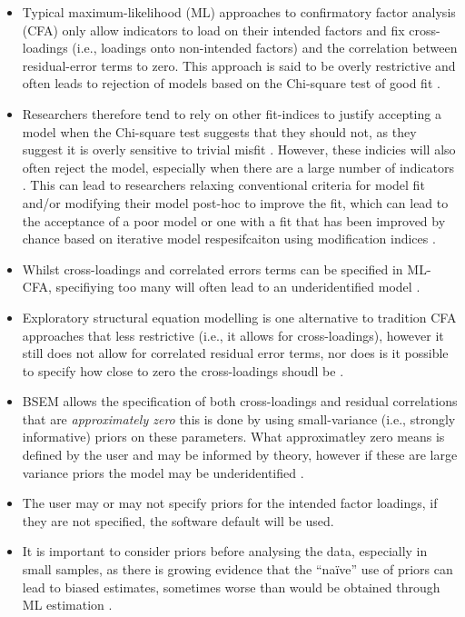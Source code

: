 \documentclass[
]{book}
\providecommand{\tightlist}{%
  \setlength{\itemsep}{0pt}\setlength{\parskip}{0pt}}
\begin{document}
\begin{itemize}
\tightlist
\item
  Typical maximum-likelihood (ML) approaches to confirmatory factor analysis (CFA) only allow indicators to load on their intended factors and fix cross-loadings (i.e., loadings onto non-intended factors) and the correlation between residual-error terms to zero. This approach is said to be overly restrictive and often leads to rejection of models based on the Chi-square test of good fit \citep{Marsh2009}.
\item
  Researchers therefore tend to rely on other fit-indices to justify accepting a model when the Chi-square test suggests that they should not, as they suggest it is overly sensitive to trivial misfit \citep{Fong2013}. However, these indicies will also often reject the model, especially when there are a large number of indicators \citep{Marsh2004}. This can lead to researchers relaxing conventional criteria for model fit and/or modifying their model post-hoc to improve the fit, which can lead to the acceptance of a poor model or one with a fit that has been improved by chance based on iterative model respesifcaiton using modification indices \citep{MacCallum1992}.
\item
  Whilst cross-loadings and correlated errors terms can be specified in ML-CFA, specifiying too many will often lead to an underidentified model \citep{Asparouhov2009}.
\item
  Exploratory structural equation modelling is one alternative to tradition CFA approaches that less restrictive (i.e., it allows for cross-loadings), however it still does not allow for correlated residual error terms, nor does is it possible to specify how close to zero the cross-loadings shoudl be \citep{Muthen2012}.
\item
  BSEM allows the specification of both cross-loadings and residual correlations that are \emph{approximately zero} this is done by using small-variance (i.e., strongly informative) priors on these parameters. What approximatley zero means is defined by the user and may be informed by theory, however if these are large variance priors the model may be underidentified \citep{Muthen2012}.
\item
  The user may or may not specify priors for the intended factor loadings, if they are not specified, the software default will be used.
\item
  It is important to consider priors before analysing the data, especially in small samples, as there is growing evidence that the ``naïve'' use of priors can lead to biased estimates, sometimes worse than would be obtained through ML estimation \citep{Smid2020}.
\end{itemize}
\end{document}
